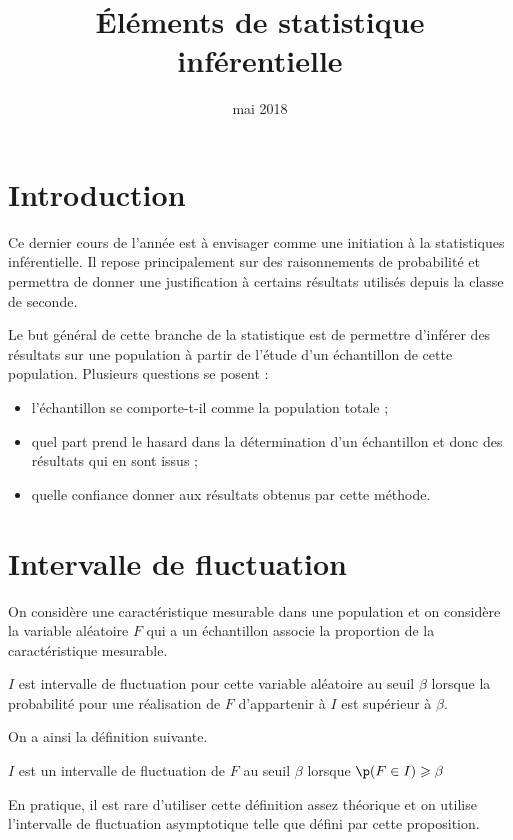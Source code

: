 \documentclass[12pt,a4paper,french]{article}
\title{Éléments de statistique inférentielle}
\author{\bsc{Jumel}}
\date{mai 2018}
\begin{document}
\noindent\maketitle


\section*{Introduction}

Ce dernier cours de l'année est à envisager comme une initiation à la
statistiques inférentielle. Il repose principalement sur des
raisonnements de probabilité et permettra de donner une justification à
certains résultats utilisés depuis la classe de seconde.

Le but général de cette branche de la statistique est de permettre
d'inférer des résultats sur une population à partir de l'étude d'un
échantillon de cette population. Plusieurs questions se posent :
\begin{itemize}
  \item l'échantillon se comporte-t-il comme la population totale ;
  \item quel part prend le hasard dans la détermination d'un échantillon
    et donc des résultats qui en sont issus ;
  \item quelle confiance donner aux résultats obtenus par cette méthode.
\end{itemize}

\section{Intervalle de fluctuation}

On considère une caractéristique mesurable dans une population et on
considère la variable aléatoire $F$ qui a un échantillon associe la
proportion de la caractéristique mesurable.

$I$ est intervalle de fluctuation pour cette variable aléatoire au seuil
$\beta$ lorsque la probabilité pour une réalisation de $F$ d'appartenir
à $I$ est supérieur à $\beta$.

On a ainsi la définition suivante.

\begin{definition}
  $I$ est un intervalle de fluctuation de $F$ au seuil $\beta$ lorsque
  $\p(F \in I) \geqslant \beta$
\end{definition}

En pratique, il est rare d'utiliser cette définition assez théorique et
on utilise l'intervalle de fluctuation asymptotique telle que défini par
cette proposition.
\end{document}
